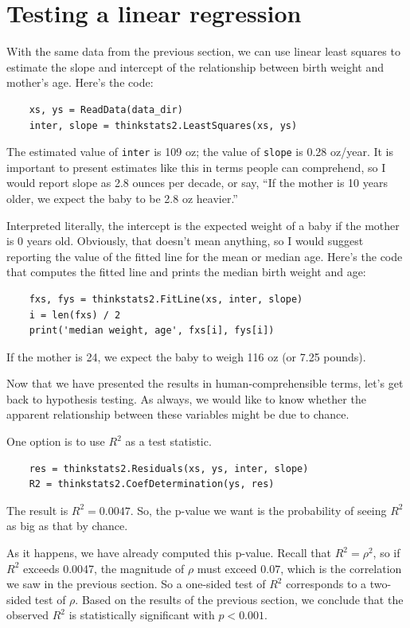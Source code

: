 \documentclass[12pt]{book}
\begin{document}
\section{Testing a linear regression}

With the same data from the previous section, we can use linear
least squares to estimate the slope and intercept of the relationship
between birth weight and mother's age.  Here's the code:

\begin{verbatim}
    xs, ys = ReadData(data_dir)
    inter, slope = thinkstats2.LeastSquares(xs, ys)
\end{verbatim}

The estimated value of {\tt inter} is 109 oz; the value of
{\tt slope} is 0.28 oz/year.  It is important to present estimates
like this in terms people can comprehend, so I would report
slope as 2.8 ounces per decade, or say, ``If the mother is
10 years older, we expect the baby to be 2.8 oz heavier.''

Interpreted literally, the intercept is the expected weight of
a baby if the mother is 0 years old.  Obviously, that doesn't
mean anything, so I would suggest reporting the value of the
fitted line for the mean or median age.  Here's the code that
computes the fitted line and prints the median birth weight
and age:

\begin{verbatim}
    fxs, fys = thinkstats2.FitLine(xs, inter, slope)
    i = len(fxs) / 2
    print('median weight, age', fxs[i], fys[i])
\end{verbatim}

If the mother is 24, we expect the baby to weigh 116 oz (or 7.25 pounds).

Now that we have presented the results in human-comprehensible terms,
let's get back to hypothesis testing.  As always, we would like to
know whether the apparent relationship between these variables might
be due to chance.

One option is to use $R^2$ as a test statistic.  

\begin{verbatim}
    res = thinkstats2.Residuals(xs, ys, inter, slope)
    R2 = thinkstats2.CoefDetermination(ys, res)
\end{verbatim}

The result is $R^2 = 0.0047$.  So, the p-value we
want is the probability of seeing $R^2$ as big as that by chance.

As it happens, we have already computed this p-value.  Recall that
$R^2 = \rho^2$, so if $R^2$ exceeds 0.0047, the magnitude of $\rho$
must exceed $0.07$, which is the correlation we saw in the previous
section.  So a one-sided test of $R^2$ corresponds to a two-sided
test of $\rho$.  Based on the results of the previous section, we
conclude that the observed $R^2$ is statistically significant with
$p < 0.001$.
\end{document}

